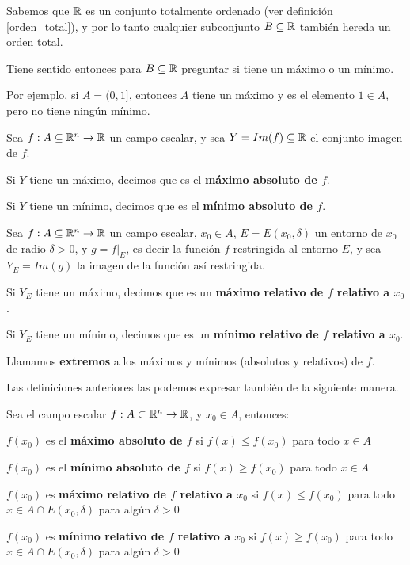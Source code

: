 Sabemos que $\mathbb{R}$ es un conjunto totalmente ordenado (ver definición \ref{orden_total}), y por lo tanto cualquier subconjunto $B \subseteq \mathbb{R}$ también hereda un orden total.

Tiene sentido entonces para $B \subseteq \mathbb{R}$ preguntar si tiene un máximo o un mínimo.

Por ejemplo, si $A = (0,1]$, entonces $A$ tiene un máximo y es el elemento $1 \in A$, pero no tiene ningún mínimo.

\begin{definition} 
Sea $f : A \subseteq \mathbb{R}^n \to \mathbb{R}$ un campo escalar, y sea $Y = Im(f) \subseteq \mathbb{R}$ el conjunto imagen de $f$.  

Si $Y$ tiene un máximo, decimos que es el \textbf{máximo absoluto de $f$}.  

Si $Y$ tiene un mínimo, decimos que es el \textbf{mínimo absoluto de $f$}.  
\end{definition}

\begin{definition} 
Sea $f : A \subseteq \mathbb{R}^n \to \mathbb{R}$ un campo escalar, $x_0 \in A$, $E = E(x_0, \delta)$ un entorno de $x_0$ de radio $\delta > 0$, y $g = f|_{E}$, es decir la función $f$ restringida al entorno $E$, y sea $Y_E = Im(g)$ la imagen de la función así restringida.

Si $Y_E$ tiene un máximo, decimos que es un \textbf{máximo relativo de $f$ relativo a $x_0$}.

Si $Y_E$ tiene un mínimo, decimos que es un \textbf{mínimo relativo de $f$ relativo a $x_0$}.
\end{definition}

\begin{definition}[Extremos]
Llamamos \textbf{extremos} a los máximos y mínimos (absolutos y relativos) de $f$.
\end{definition}

\begin{observation}
Las definiciones anteriores las podemos expresar también de la siguiente manera.

Sea el campo escalar $ f : A \subset \mathbb{R}^n \to \mathbb{R}$, y $ x_0 \in A$, entonces:

$ f(x_0)$ es el \textbf{máximo absoluto de $f$} si $ f(x) \leq f(x_0)$ para todo $x \in A$

$ f(x_0)$ es el \textbf{mínimo absoluto de $f$} si $ f(x) \geq f(x_0)$ para todo $x \in A$

$ f(x_0)$ es \textbf{máximo relativo de $f$ relativo a $x_0$} si $ f(x) \leq f(x_0)$ para todo $x \in A \cap E(x_0, \delta)$ para algún $\delta > 0$

$ f(x_0)$ es \textbf{mínimo relativo de $f$ relativo a $x_0$} si $ f(x) \geq f(x_0)$ para todo $x \in A \cap E(x_0, \delta)$ para algún $\delta > 0$
\end{observation}

